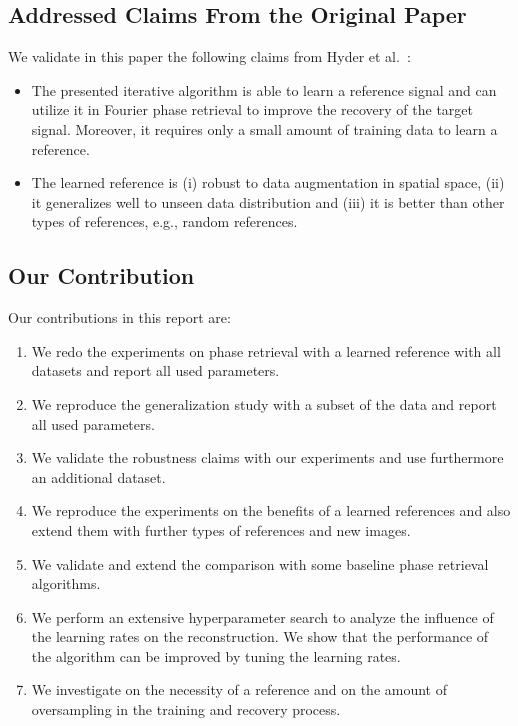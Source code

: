 \subsection{Addressed Claims From the Original Paper}

We validate in this paper the following claims from Hyder et al.~\cite{hyder2020solving}:
\begin{itemize}
\item The presented iterative algorithm is able to learn a reference
  signal and can utilize it in Fourier phase retrieval to improve the
  recovery of the target signal. Moreover, it requires only a small
  amount of training data to learn a reference.
    \item The learned reference is (i) robust to data augmentation in spatial space, (ii) it generalizes well to unseen data distribution and (iii) it is better than other types of references, e.g., random references.
\end{itemize}

\subsection{Our Contribution}

Our contributions in this report are:
\begin{enumerate}
	\item We redo the experiments on phase retrieval with a learned reference with all datasets and report all used parameters.
	\item We reproduce the generalization study with a subset of the data and report all used parameters.
	\item We validate the robustness claims with our experiments and use furthermore an additional dataset.
	\item We reproduce the experiments on the benefits of a learned references and also extend them with further types of references and new images.
	\item We validate and extend the comparison with some baseline phase retrieval algorithms.
	\item We perform an extensive hyperparameter search to analyze the influence of the learning rates on the reconstruction. We show that the performance of the algorithm can be improved by tuning the learning rates.
	\item We investigate on the necessity of a reference and on the amount of oversampling in the training and recovery process.
\end{enumerate}

